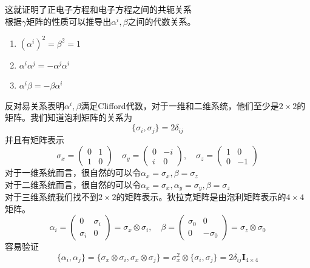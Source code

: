 \documentclass{article}
\numberwithin{equation}{subsection}
\begin{document}
    这就证明了正电子方程和电子方程之间的共轭关系\\
    根据$\gamma$矩阵的性质可以推导出$\alpha^i,\beta$之间的代数关系。
    \begin{enumerate}
        \item $(\alpha^i)^2=\beta^2=1$
        \item $\alpha^i\alpha^j=-\alpha^j\alpha^i$
        \item $\alpha^i\beta=-\beta\alpha^i$
    \end{enumerate}
    反对易关系表明$\alpha^i,\beta$满足Clifford代数，对于一维和二维系统，他们至少是$2\times 2$的矩阵。我们知道泡利矩阵的关系为
    \begin{equation}
        \{\sigma_i,\sigma_j\}=2\delta_{ij}
    \end{equation}
    并且有矩阵表示
    \begin{equation}
    \sigma_x=\begin{pmatrix}0&1\\1&0\end{pmatrix}\quad\sigma_y=\begin{pmatrix}0&-i\\i&0\end{pmatrix},\quad\sigma_z=\begin{pmatrix}1&0\\0&-1\end{pmatrix}
    \end{equation}
    对于一维系统而言，很自然的可以令$\alpha_x=\sigma_x,\beta=\sigma_z$\\
    对于二维系统而言，很自然的可以令$\alpha_x=\sigma_x,\alpha_y=\sigma_y,\beta=\sigma_z$\\
    对于三维系统我们找不到$2\times 2$的矩阵表示。狄拉克矩阵是由泡利矩阵表示的$4\times 4$矩阵。
    \begin{equation}
        \alpha_i=\begin{pmatrix}
            0&\sigma_i\\
            \sigma_i&0
        \end{pmatrix}=\sigma_x\otimes\sigma_i,\quad\beta=\begin{pmatrix}
            \sigma_0&0\\
            0&-\sigma_0
        \end{pmatrix}=\sigma_z\otimes\sigma_0
    \end{equation}
    容易验证
    \begin{equation}
        \{\alpha_i,\alpha_j\}=\{\sigma_x\otimes\sigma_i,\sigma_x\otimes\sigma_j\}=\sigma_x^2\otimes\{\sigma_i,\sigma_j\}=2\delta_{ij}\mathbf{I}_{4\times4}
    \end{equation}
\end{document}
